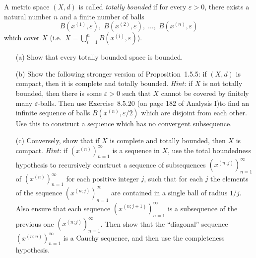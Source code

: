 \begin{problem}[24pts]
  A metric space $(X,d)$ is called \emph{totally bounded} if for every $\varepsilon > 0$, there exists a natural number $n$ and a finite number of balls
\[
B(x^{(1)},\varepsilon), \; B(x^{(2)},\varepsilon), \; \dots, \; B(x^{(n)},\varepsilon)
\]
which cover $X$ (i.e.\ $X = \bigcup_{i=1}^n B(x^{(i)},\varepsilon)$).

\begin{enumerate}
\item[(a)] Show that every totally bounded space is bounded.

\item[(b)] Show the following stronger version of Proposition~1.5.5: if $(X,d)$ is compact, then it is complete and totally bounded.  
\emph{Hint:} if $X$ is not totally bounded, then there is some $\varepsilon > 0$ such that $X$ cannot be covered by finitely many $\varepsilon$-balls.  
Then use Exercise~8.5.20  (on page 182 of Analysis I)to find an infinite sequence of balls $B(x^{(n)},\varepsilon/2)$ which are disjoint from each other. Use this to construct a sequence which has no convergent subsequence.

\item[(c)] Conversely, show that if $X$ is complete and totally bounded, then $X$ is compact.  
\emph{Hint:} if $(x^{(n)})_{n=1}^\infty$ is a sequence in $X$, use the total boundedness hypothesis to recursively construct a sequence of subsequences $(x^{(n;j)})_{n=1}^\infty$ of $(x^{(n)})_{n=1}^\infty$ for each positive integer $j$, such that for each $j$ the elements of the sequence $(x^{(n;j)})_{n=1}^\infty$ are contained in a single ball of radius $1/j$.  
Also ensure that each sequence $(x^{(n;j+1)})_{n=1}^\infty$ is a subsequence of the previous one $(x^{(n;j)})_{n=1}^\infty$.  
Then show that the ``diagonal'' sequence $(x^{(n;n)})_{n=1}^\infty$ is a Cauchy sequence, and then use the completeness hypothesis.
\end{enumerate}
\end{problem}

